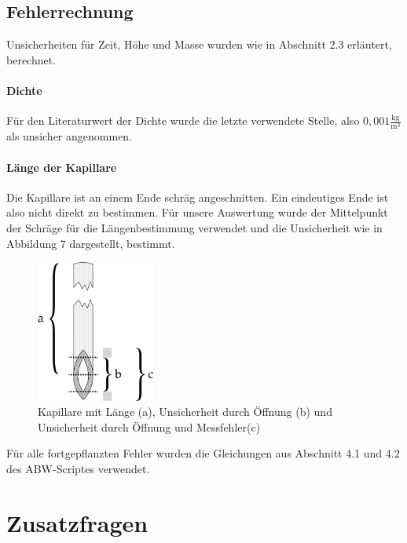 \documentclass{article}
\begin{document}
\subsection{Fehlerrechnung}
Unsicherheiten für Zeit, Höhe und Masse wurden wie in Abschnitt 2.3 erläutert, berechnet. 
\paragraph{Dichte} Für den Literaturwert der Dichte \cite{8} wurde die letzte verwendete Stelle, also $0,001\frac{\textrm{kg}}{\textrm{m}^3}$ als unsicher angenommen.
\paragraph{Länge der Kapillare} Die Kapillare ist an einem Ende schräg angeschnitten. Ein eindeutiges Ende ist also nicht direkt zu bestimmen. Für unsere Auswertung wurde der Mittelpunkt der Schräge für die Längenbestimmung verwendet und die Unsicherheit wie in Abbildung 7 dargestellt, bestimmt.
\begin{figure}[H]
\centering
\includegraphics[width=110pt]{KapillareMasse.png}
\caption{Kapillare mit Länge (a), Unsicherheit durch Öffnung (b) und Unsicherheit durch Öffnung und Messfehler(c)}
\label{fig:length_eight_mouse}
\end{figure}
\noindent
Für alle fortgepflanzten Fehler wurden die Gleichungen aus Abschnitt 4.1 und 4.2 des ABW-Scriptes \cite{2} verwendet.
\section{Zusatzfragen}
\end{document}
